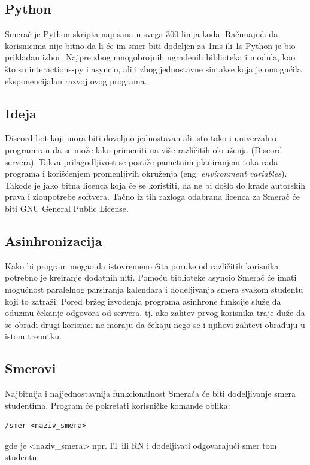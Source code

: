 \documentclass[a4paper,11pt]{article}
\begin{document}
\subsection{Python}
Smerač je Python\cite{python} skripta napisana u svega 300 linija koda. Računajući da korisnicima nije bitno da li će im smer biti dodeljen za 1ms ili 1s Python je bio prikladan izbor. Najpre zbog mnogobrojnih ugrađenih biblioteka i modula, kao što su interactions-py\cite{interactions-py} i asyncio\cite{asyncio}, ali i zbog jednostavne sintakse koja je omogućila eksponencijalan razvoj ovog programa.
\subsection{Ideja}
Discord bot koji mora biti dovoljno jednostavan ali isto tako i univerzalno programiran da se može lako primeniti na više različitih okruženja (Discord servera). Takva prilagodljivost se postiže pametnim planiranjem toka rada programa i korišćenjem promenljivih okruženja (eng. \textit{environment variables}). Takođe je jako bitna licenca koja će se koristiti, da ne bi došlo do krađe autorskih prava i zloupotrebe softvera. Tačno iz tih razloga odabrana licenca za Smerač će biti GNU General Public License\cite{gpl}.
\subsection{Asinhronizacija}
Kako bi program mogao da istovremeno čita poruke od različitih korisnika potrebno je kreiranje dodatnih niti. Pomoću biblioteke asyncio Smerač će imati mogućnost paralelnog parsiranja kalendara i dodeljivanja smera svakom studentu koji to zatraži. Pored bržeg izvođenja programa asinhrone funkcije služe da oduzmu čekanje odgovora od servera, tj. ako zahtev prvog korisnika traje duže da se obradi drugi korisnici ne moraju da čekaju nego se i njihovi zahtevi obrađuju u istom trenutku.
\subsection{Smerovi}
Najbitnija i najjednostavnija funkcionalnost Smerača će biti dodeljivanje smera studentima. Program će pokretati korisničke komande oblika:
\begin{verbatim}
/smer <naziv_smera>
\end{verbatim}
gde je <naziv\_smera> npr. IT ili RN i dodeljivati odgovarajući smer tom studentu.
\newpage
\end{document}
